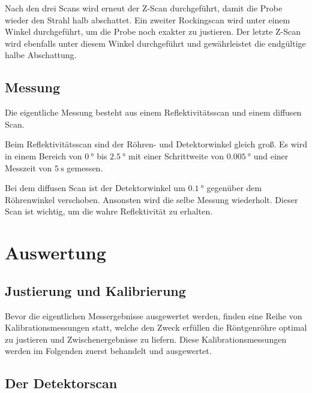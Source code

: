 Nach den drei Scans wird erneut der Z-Scan durchgeführt, damit die Probe wieder den Strahl halb abschattet.
Ein zweiter Rockingscan wird unter einem Winkel durchgeführt, um die Probe noch exakter zu justieren.
Der letzte Z-Scan wird ebenfalls unter diesem Winkel durchgeführt und gewährleistet die endgültige halbe Abschattung. %



\subsection{Messung}
Die eigentliche Messung besteht aus einem Reflektivitätsscan und einem diffusen Scan.

Beim Reflektivitätsscan sind der Röhren- und Detektorwinkel gleich groß. Es wird in einem Bereich von $\SI{0}{\degree}$ bis $\SI{2.5}{\degree}$ mit einer Schrittweite von $\SI{0.005}{\degree}$ und einer Messzeit von $\SI{5}{\second}$ gemessen.

Bei dem diffusen Scan ist der Detektorwinkel um $\SI{0.1}{\degree}$ gegenüber dem Röhrenwinkel verschoben. Ansonsten wird die selbe Messung wiederholt. Dieser Scan ist wichtig, um die wahre Reflektivität zu erhalten. %


\section{Auswertung}
\subsection{Justierung und Kalibrierung}
Bevor die eigentlichen Messergebnisse ausgewertet werden, finden eine Reihe von Kalibrationsmessungen statt,
welche den Zweck erfüllen die Röntgenröhre optimal zu justieren und Zwischenergebnisse zu liefern.
Diese Kalibrationsmessungen werden im Folgenden zuerst behandelt und ausgewertet.

\subsection*{Der Detektorscan}

